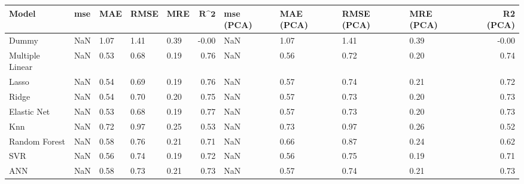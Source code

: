 \begin{table}
\centering
\label{table:iri_reg_pred}
\begin{tabular}{lllllrllllr}
\toprule
 \textbf{Model} & \textbf{mse} & \textbf{MAE} & \textbf{RMSE} & \textbf{MRE} & $\textbf{R^2}$ & \textbf{mse (PCA)} & \textbf{MAE (PCA)} & \textbf{RMSE (PCA)} & \textbf{MRE (PCA)} & \textbf{R2 (PCA)} \\
\midrule
          Dummy &          NaN &         1.07 &          1.41 &         0.39 &          -0.00 &                NaN &               1.07 &                1.41 &               0.39 &             -0.00 \\
Multiple Linear &          NaN &         0.53 &          0.68 &         0.19 &           0.76 &                NaN &               0.56 &                0.72 &               0.20 &              0.74 \\
          Lasso &          NaN &         0.54 &          0.69 &         0.19 &           0.76 &                NaN &               0.57 &                0.74 &               0.21 &              0.72 \\
          Ridge &          NaN &         0.54 &          0.70 &         0.20 &           0.75 &                NaN &               0.57 &                0.73 &               0.20 &              0.73 \\
    Elastic Net &          NaN &         0.53 &          0.68 &         0.19 &           0.77 &                NaN &               0.57 &                0.73 &               0.20 &              0.73 \\
            Knn &          NaN &         0.72 &          0.97 &         0.25 &           0.53 &                NaN &               0.73 &                0.97 &               0.26 &              0.52 \\
  Random Forest &          NaN &         0.58 &          0.76 &         0.21 &           0.71 &                NaN &               0.66 &                0.87 &               0.24 &              0.62 \\
            SVR &          NaN &         0.56 &          0.74 &         0.19 &           0.72 &                NaN &               0.56 &                0.75 &               0.19 &              0.71 \\
            ANN &          NaN &         0.58 &          0.73 &         0.21 &           0.73 &                NaN &               0.57 &                0.74 &               0.21 &              0.73 \\
\bottomrule
\end{tabular}
\end{table}
